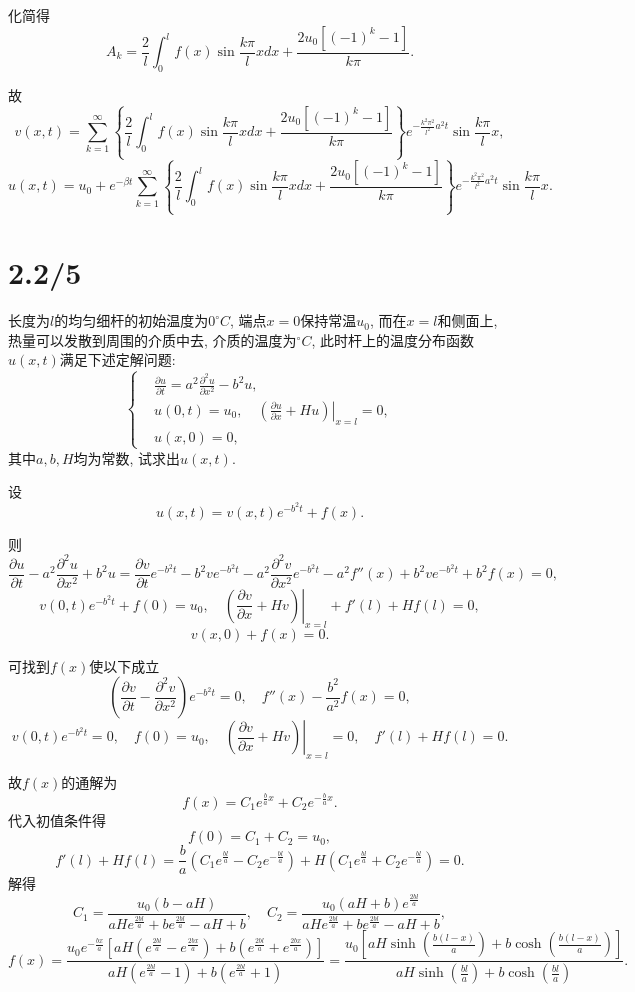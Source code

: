 \documentclass[11pt,a4paper]{article}
\begin{document}
化简得
$$A_k=\frac{2}{l}\int_0^l f(x)\sin \frac{k\pi}{l} xdx+\frac{2u_0[(-1)^k-1]}{k\pi}.$$

故
$$v(x,t)=\sum_{k=1}^\infty \left\{\frac{2}{l}\int_0^l f(x)\sin \frac{k\pi}{l} xdx+\frac{2u_0[(-1)^k-1]}{k\pi}\right\} e^{-\frac{k^2\pi^2}{l^2}a^2t}\sin \frac{k\pi}{l} x,$$
$$u(x,t)=u_0+e^{-\beta t}\sum_{k=1}^\infty \left\{\frac{2}{l}\int_0^l f(x)\sin \frac{k\pi}{l} xdx+\frac{2u_0[(-1)^k-1]}{k\pi}\right\} e^{-\frac{k^2\pi^2}{l^2}a^2t}\sin \frac{k\pi}{l} x.$$

\section{2.2/5}
\begin{problem}
长度为$l$的均匀细杆的初始温度为$0^\circ C$, 端点$x=0$保持常温$u_0$, 而在$x=l$和侧面上, 热量可以发散到周围的介质中去, 介质的温度为$^\circ C$, 此时杆上的温度分布函数$u(x,t)$满足下述定解问题:
$$\left\{\begin{aligned}
     & \frac{\partial u}{\partial t}=a^2\frac{\partial^2u}{\partial x^2}-b^2u,              \\
     & u(0,t)=u_0,\quad \left.\left(\frac{\partial u}{\partial x}+Hu\right)\right|_{x=l}=0, \\
     & u(x,0)=0,
  \end{aligned}\right.$$
其中$a,b,H$均为常数, 试求出$u(x,t)$.
\end{problem}

设
$$u(x,t)=v(x,t)e^{-b^2t}+f(x).$$

则
$$\frac{\partial u}{\partial t}-a^2\frac{\partial^2u}{\partial x^2}+b^2u=\frac{\partial v}{\partial t}e^{-b^2t}-b^2ve^{-b^2t}-a^2\frac{\partial^2v}{\partial x^2}e^{-b^2t}-a^2f''(x)+b^2ve^{-b^2t}+b^2f(x)=0,$$
$$v(0,t)e^{-b^2t}+f(0)=u_0,\quad \left.\left(\frac{\partial v}{\partial x}+Hv\right)\right|_{x=l}+f'(l)+Hf(l)=0,$$
$$v(x,0)+f(x)=0.$$

可找到$f(x)$使以下成立
$$\left(\frac{\partial v}{\partial t}-\frac{\partial^2v}{\partial x^2}\right)e^{-b^2t}=0,\quad f''(x)-\frac{b^2}{a^2}f(x)=0,$$
$$v(0,t)e^{-b^2t}=0,\quad f(0)=u_0,\quad \left.\left(\frac{\partial v}{\partial x}+Hv\right)\right|_{x=l}=0,\quad f'(l)+Hf(l)=0.$$

故$f(x)$的通解为
$$f(x)=C_1e^{\frac{b}{a}x}+C_2e^{-\frac{b}{a}x}.$$
代入初值条件得
$$f(0)=C_1+C_2=u_0,$$
$$f'(l)+Hf(l)=\frac{b}{a}\left(C_1e^{\frac{bl}{a}}-C_2e^{-\frac{bl}{a}}\right)+H\left(C_1e^{\frac{bl}{a}}+C_2e^{-\frac{bl}{a}}\right)=0.$$
解得
$$C_1=\frac{u_0(b-a H)}{a H e^{\frac{2 b l}{a}}+b e^{\frac{2 b l}{a}}-a H+b},\quad C_2=\frac{u_0(a H+b) e^{\frac{2 b l}{a}}}{a H e^{\frac{2 b l}{a}}+b e^{\frac{2 b l}{a}}-a H+b},$$
$$f(x)=\frac{u_0 e^{-\frac{b x}{a}} \left[a H \left(e^{\frac{2 b l}{a}}-e^{\frac{2 b x}{a}}\right)+b \left(e^{\frac{2 b l}{a}}+e^{\frac{2 b x}{a}}\right)\right]}{a H \left(e^{\frac{2 b l}{a}}-1\right)+b \left(e^{\frac{2 b l}{a}}+1\right)}=\frac{u_0 \left[a H \sinh \left(\frac{b (l-x)}{a}\right)+b \cosh \left(\frac{b (l-x)}{a}\right)\right]}{a H \sinh \left(\frac{b l}{a}\right)+b \cosh \left(\frac{b l}{a}\right)}.$$
\end{document}
